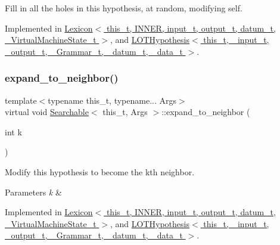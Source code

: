 Fill in all the holes in this hypothesis, at random, modifying self. 



Implemented in \hyperlink{class_lexicon_a881ff3280b54f56b88d2511e319b5a4d}{Lexicon$<$ this\+\_\+t, I\+N\+N\+E\+R, input\+\_\+t, output\+\_\+t, datum\+\_\+t, \+\_\+\+Virtual\+Machine\+State\+\_\+t $>$}, and \hyperlink{class_l_o_t_hypothesis_a1c4f97c379f7acf16d4773790b9e7a41}{L\+O\+T\+Hypothesis$<$ this\+\_\+t, \+\_\+input\+\_\+t, \+\_\+output\+\_\+t, \+\_\+\+Grammar\+\_\+t, \+\_\+datum\+\_\+t, \+\_\+data\+\_\+t $>$}.

\mbox{\label{class_searchable_a9088dba3920f4c66ce671aa16a7d29a4}} 
\subsubsection{\texorpdfstring{expand\+\_\+to\+\_\+neighbor()}{expand\_to\_neighbor()}}
{\footnotesize\ttfamily template$<$typename this\+\_\+t, typename... Args$>$ \\
virtual void \hyperlink{class_searchable}{Searchable}$<$ this\+\_\+t, Args $>$\+::expand\+\_\+to\+\_\+neighbor (\begin{DoxyParamCaption}\item[{int}]{k }\end{DoxyParamCaption})\hspace{0.3cm}{\ttfamily [pure virtual]}}



Modify this hypothesis to become the k\textquotesingle{}th neighbor. 


\begin{DoxyParams}{Parameters}
{\em k} & \\
\hline
\end{DoxyParams}


Implemented in \hyperlink{class_lexicon_a283893cb37705bd6421fb3a1dc94432f}{Lexicon$<$ this\+\_\+t, I\+N\+N\+E\+R, input\+\_\+t, output\+\_\+t, datum\+\_\+t, \+\_\+\+Virtual\+Machine\+State\+\_\+t $>$}, and \hyperlink{class_l_o_t_hypothesis_a448c8ed494a4199c63e676b4a06b4af6}{L\+O\+T\+Hypothesis$<$ this\+\_\+t, \+\_\+input\+\_\+t, \+\_\+output\+\_\+t, \+\_\+\+Grammar\+\_\+t, \+\_\+datum\+\_\+t, \+\_\+data\+\_\+t $>$}.

\mbox{\label{class_searchable_a2f2e0290252b5f43c98bc345844070ae}} 
